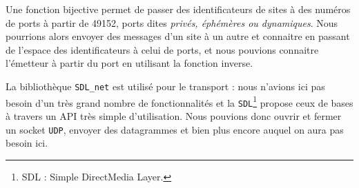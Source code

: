 Une fonction bijective permet de passer des identificateurs de sites à des numéros de ports à partir de \textsc{49152}, ports dites \emph{privés, éphémères ou dynamiques}. Nous pourrions alors envoyer des messages d'un site à un autre et connaitre en passant de l'espace des identificateurs à celui de ports, et nous pouvions connaitre l'émetteur à partir du port en utilisant la fonction inverse. 

La bibliothèque \texttt{SDL\_net} est utilisé pour le transport : nous n'avions ici pas besoin d'un très grand nombre de fonctionnalités et la \texttt{SDL}\footnote{SDL : Simple DirectMedia Layer.} propose ceux de bases à travers un API très simple d'utilisation. Nous pouvions donc ouvrir et fermer un socket \texttt{UDP}, envoyer des datagrammes et bien plus encore auquel on aura pas besoin ici.